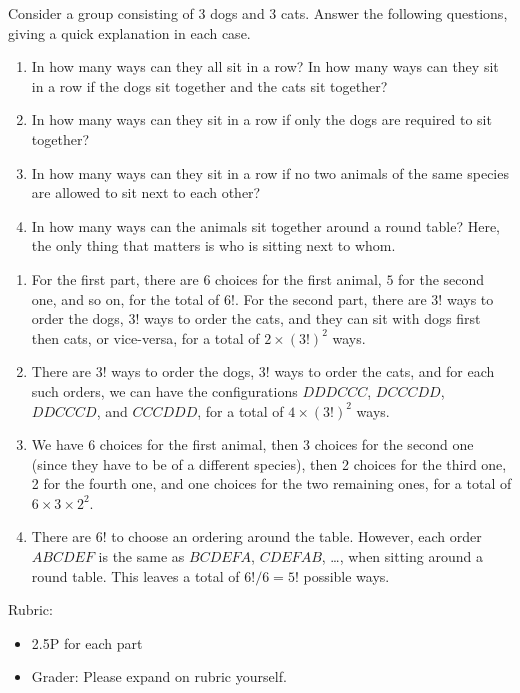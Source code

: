 \documentclass{article}
\theoremstyle{definition}
\begin{document}
\begin{question}
Consider a group consisting of 3 dogs and 3 cats. Answer the following questions, giving a quick explanation in each case.

\begin{enumerate}
	\item In how many ways can they all sit in a row? In how many ways can they sit in a row if the dogs sit together and the cats sit together?
	\item In how many ways can they sit in a row if only the dogs are required to sit together?
	\item In how many ways can they sit in a row if no two animals of the same species are allowed to sit next to each other?
	\item In how many ways can the animals sit together around a round table? Here, the only thing that matters is who is sitting next to whom.
\end{enumerate}
\end{question}
\begin{solution}
\begin{enumerate}
	\item For the first part, there are $6$ choices for the first animal, $5$ for the second one, and so on, for the total of $6!$. For the second part, there are $3!$ ways to order the dogs, $3!$ ways to order the cats, and they can sit with dogs first then cats, or vice-versa, for a total of $2 \times (3!)^2$ ways.
	
	\item There are $3!$ ways to order the dogs, $3!$ ways to order the cats, and for each such orders, we can have the configurations $DDDCCC$, $DCCCDD$, $DDCCCD$, and $CCCDDD$, for a total of $4 \times (3!)^2$ ways.
	
	\item We have 6 choices for the first animal, then 3 choices for the second one (since they have to be of a different species), then 2 choices for the third one, 2 for the fourth one, and one choices for the two remaining ones, for a total of $6 \times 3 \times 2^2$.
	
	\item There are $6!$ to choose an ordering around the table. However, each order $ABCDEF$ is the same as $BCDEFA$, $CDEFAB$, \dots, when sitting around a round table. This leaves a total of $6! / 6 = 5!$ possible ways.
	
\end{enumerate}
{\color{red} Rubric:
\begin{itemize}
\item 2.5P for each part
\item Grader: Please expand on rubric yourself.
\end{itemize}}
\end{solution}
\end{document}
